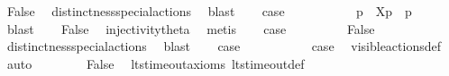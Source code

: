 \begin{isabellebody}
\ False\ \isamarkupfalse%
\ distinctness{\isacharunderscore}{\kern0pt}special{\isacharunderscore}{\kern0pt}actions\ \isamarkupfalse%
\ blast\isanewline
\ \ \isamarkupfalse%
\ {\isacharquery}{\kern0pt}case\ \isacommand{{\isachardot}{\kern0pt}{\isachardot}{\kern0pt}}\isamarkupfalse%
\isanewline
{}\isamarkupfalse%
\isanewline
\ \ \isamarkupfalse%
\ {}\isanewline
\ \ \isamarkupfalse%
\ \isamarkupfalse%
\ p{\isacharprime}{\kern0pt}\ \ {\isacartoucheopen}{\isasymtheta}{\isacharbrackleft}{\kern0pt}X{\isacharbrackright}{\kern0pt}{\isacharparenleft}{\kern0pt}p{\isacharparenright}{\kern0pt}\ {\isacharequal}{\kern0pt}\ {\isasymtheta}{\isacharparenleft}{\kern0pt}p{\isacharprime}{\kern0pt}{\isacharparenright}{\kern0pt}{\isacartoucheclose}\ \isamarkupfalse%
\ blast\isanewline
\ \ \isamarkupfalse%
\ False\ \isamarkupfalse%
\ injectivity{\isacharunderscore}{\kern0pt}theta{\isacharparenleft}{\kern0pt}{}{\isacharparenright}{\kern0pt}\ \isamarkupfalse%
\ metis\isanewline
\ \ \isamarkupfalse%
\ {\isacharquery}{\kern0pt}case\ \isacommand{{\isachardot}{\kern0pt}{\isachardot}{\kern0pt}}\isamarkupfalse%
\isanewline
{}\isamarkupfalse%
\isanewline
\ \ \isamarkupfalse%
\ {}\isanewline
\ \ \isamarkupfalse%
\ False\ \isamarkupfalse%
\ distinctness{\isacharunderscore}{\kern0pt}special{\isacharunderscore}{\kern0pt}actions\ \isamarkupfalse%
\ blast\isanewline
\ \ \isamarkupfalse%
\ {\isacharquery}{\kern0pt}case\ \isacommand{{\isachardot}{\kern0pt}{\isachardot}{\kern0pt}}\isamarkupfalse%
\isanewline
{}\isamarkupfalse%
\isanewline
\ \ \isamarkupfalse%
\ {}\isanewline
\ \ \isamarkupfalse%
\ \isamarkupfalse%
\ {\isacharquery}{\kern0pt}case\ \isamarkupfalse%
\ visible{\isacharunderscore}{\kern0pt}actions{\isacharunderscore}{\kern0pt}def\ \isamarkupfalse%
\ auto\isanewline
{}\isamarkupfalse%
\isanewline
\ \ \isamarkupfalse%
\ {}\isanewline
\ \ \isamarkupfalse%
\ False\ \isamarkupfalse%
\ lts{\isacharunderscore}{\kern0pt}timeout{\isacharunderscore}{\kern0pt}axioms\ lts{\isacharunderscore}{\kern0pt}timeout{\isacharunderscore}{\kern0pt}def\ \isamarkupfalse%

\end{isabellebody}
